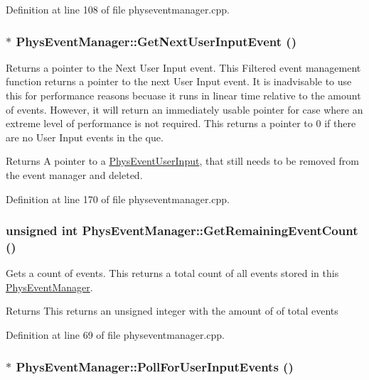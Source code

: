 Definition at line 108 of file physeventmanager.cpp.\hypertarget{classPhysEventManager_a4874a9b1138d2351bf28e527a66c02b8}{
\subsubsection[{GetNextUserInputEvent}]{ $\ast$ PhysEventManager::GetNextUserInputEvent ()}}
\label{d5/dd7/classPhysEventManager_a4874a9b1138d2351bf28e527a66c02b8}


Returns a pointer to the Next User Input event. This Filtered event management function returns a pointer to the next User Input event. It is inadvisable to use this for performance reasons becuase it runs in linear time relative to the amount of events. However, it will return an immediately usable pointer for case where an extreme level of performance is not required. This returns a pointer to 0 if there are no User Input events in the que. \begin{DoxyReturn}{Returns}
A pointer to a \hyperlink{classPhysEventUserInput}{PhysEventUserInput}, that still needs to be removed from the event manager and deleted. 
\end{DoxyReturn}


Definition at line 170 of file physeventmanager.cpp.\hypertarget{classPhysEventManager_ab14d238e7abe9919be8e2d9eef388b64}{
\subsubsection[{GetRemainingEventCount}]{\setlength{\rightskip}{0pt plus 5cm}unsigned int PhysEventManager::GetRemainingEventCount ()}}
\label{d5/dd7/classPhysEventManager_ab14d238e7abe9919be8e2d9eef388b64}


Gets a count of events. This returns a total count of all events stored in this \hyperlink{classPhysEventManager}{PhysEventManager}. \begin{DoxyReturn}{Returns}
This returns an unsigned integer with the amount of of total events 
\end{DoxyReturn}


Definition at line 69 of file physeventmanager.cpp.\hypertarget{classPhysEventManager_ac66ebe495e2a77d06803291711528db2}{
\subsubsection[{PollForUserInputEvents}]{ $\ast$ PhysEventManager::PollForUserInputEvents ()}}
\label{d5/dd7/classPhysEventManager_ac66ebe495e2a77d06803291711528db2}


